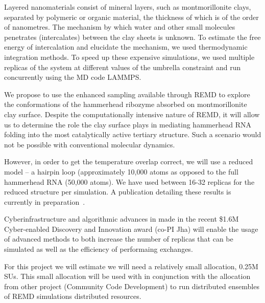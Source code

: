 \documentclass[a4paper,11pt]{article}
\newcommand{\up}{\vspace*{-1em}}
\begin{document}
Layered nanomaterials consist of mineral layers, such as montmorillonite clays, separated by polymeric or organic material, the thickness of which is of the order of nanometres. The mechanism by which water and other small molecules penetrates (intercalates) between the clay sheets is unknown. To estimate the free energy of intercalation and elucidate the mechanism, we used thermodynamic integration methods. To speed up these expensive simulations, we used multiple replicas of the system at different values of the umbrella constraint and run concurrently using the MD code LAMMPS. 

We propose to use the enhanced sampling available through REMD to explore the conformations of the hammerhead ribozyme absorbed on montmorillonite clay surface. Despite the computationally intensive nature of REMD, it will allow us to determine the role the clay surface plays in mediating hammerhead RNA folding into the most catalytically active tertiary structure. Such a scenario would not be possible with conventional molecular dynamics.

However, in order to get the temperature overlap correct, we will use a reduced model -- a hairpin loop (approximately 10,000 atoms as opposed to the full hammerhead RNA (50,000 atoms).  We have used between 16-32 replicas for the reduced structure per simulation. %
A publication detailing these results is currently in preparation~\cite{Ref11}.

Cyberinfrastructure and algorithmic advances in made in the recent \$1.6M Cyber-enabled Discovery and Innovation award (co-PI Jha) will enable the usage of advanced methods to both increase the number of replicas that can be simulated as well as the efficiency of performaing exchanges.


For this project we will estimate we will need a relatively small allocation, 0.25M SUs. This small allocation will be used with in conjunction with the allocation from other project (Community Code Development) to run distributed ensembles of REMD simulations distributed resources.%


\end{document}
